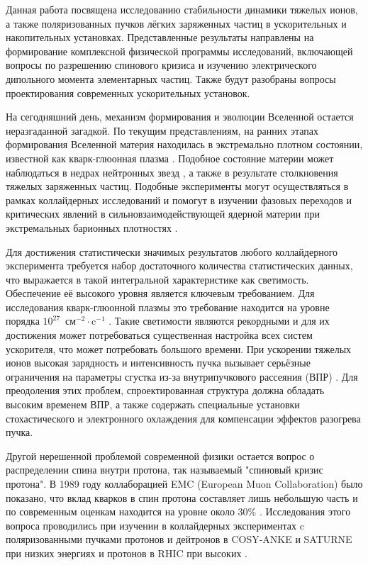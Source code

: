 \par	Данная работа посвящена исследованию стабильности динамики тяжелых ионов, а также поляризованных пучков лёгких заряженных частиц в ускорительных и накопительных установках. Представленные результаты направлены на формирование комплексной физической программы исследований, включающей вопросы по разрешению спинового кризиса и изучению электрического дипольного момента элементарных частиц. Также будут разобраны вопросы проектирования современных ускорительных установок.

\par	На сегодняшний день, механизм формирования и эволюции Вселенной остается неразгаданной загадкой. По текущим представлениям, на ранних этапах формирования Вселенной материя находилась в экстремально плотном состоянии, известной как кварк-глюонная плазма \cite{phase_transition_universe}. Подобное состояние материи может наблюдаться в недрах нейтронных звезд \cite{neutron_stars}, а также в результате столкновения тяжелых заряженных частиц. Подобные эксперименты могут осуществляться в рамках коллайдерных исследований и помогут в изучении фазовых переходов и критических явлений в сильновзаимодействующей ядерной материи при экстремальных барионных плотностях \cite{quark_gluon}.

\par	Для достижения статистически значимых результатов любого коллайдерного эксперимента требуется набор достаточного количества статистических данных, что выражается в такой интегральной характеристике как светимость. Обеспечение её высокого уровня является ключевым требованием. Для исследования кварк-глюонной плазмы это требование находится на уровне порядка $10^{27}$~$\text{см}^{-2}\cdot\text{c}^{-1}$ \cite{RHIC_luminosity_heavy}. Такие светимости являются рекордными и для их достижения может потребоваться существенная настройка всех систем ускорителя, что может потребовать большого времени. При ускорении тяжелых ионов высокая зарядность и интенсивность пучка вызывает серьёзные ограничения на параметры сгустка из-за внутрипучкового рассеяния (ВПР) \cite{2016_IBS}. Для преодоления этих проблем, спроектированная структура должна обладать высоким временем ВПР, а также содержать специальные установки стохастического и электронного охлаждения для компенсации эффектов разогрева пучка.

\par	Другой нерешенной проблемой современной физики остается вопрос о распределении спина внутри протона, так называемый "спиновый кризис протона". В 1989 году коллаборацией EMC (European Muon Collaboration) \cite{spin_crisis_1989} было показано, что вклад кварков в спин протона составляет лишь небольшую часть и по современным оценкам находится на уровне около 30$\%$ \cite{quarks_overview_2022}. Исследования этого вопроса проводились при изучении в коллайдерных экспериментах c поляризованными пучками протонов и дейтронов в COSY-ANKE \cite{COSY_ANKE} и SATURNE \cite{SATURNE} при низких энергиях и протонов в RHIC при высоких \cite{RHIC_2014}. 

